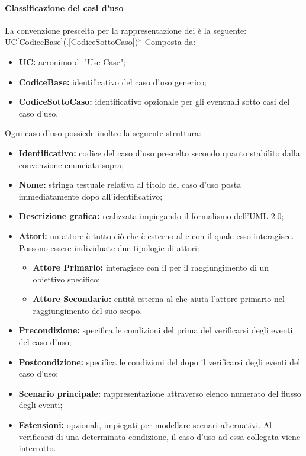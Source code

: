 \paragraph{Classificazione dei casi d'uso}
\label{Class_uso}
La convenzione prescelta per la rappresentazione dei  è la seguente:
UC[CodiceBase](.[CodiceSottoCaso])*
Composta da:
\begin{itemize}
	\item \textbf{UC:} acronimo di "Use Case";
	\item \textbf{CodiceBase:} identificativo del caso d'uso generico;
	\item \textbf{CodiceSottoCaso:} identificativo opzionale per gli eventuali sotto casi del caso d'uso.
\end{itemize}
Ogni caso d'uso possiede inoltre la seguente struttura:
\begin{itemize}
	\item \textbf{Identificativo:} codice del caso d'uso prescelto secondo quanto stabilito dalla convenzione enunciata sopra;
	\item \textbf{Nome:} stringa testuale relativa al titolo del caso d'uso posta immediatamente dopo all'identificativo;
	\item \textbf{Descrizione grafica:} realizzata impiegando il formalismo dell'UML 2.0;
	\item \textbf{Attori:} un attore è tutto ciò che è esterno al  e con il quale esso interagisce. Possono essere individuate due tipologie di attori:
	\begin{itemize}
		\item \textbf{Attore Primario:} interagisce con il  per il raggiungimento di un obiettivo specifico;
		\item \textbf{Attore Secondario:} entità esterna al  che aiuta l'attore primario nel raggiungimento del suo scopo.
	\end{itemize}
	\item \textbf{Precondizione:} specifica le condizioni del  prima del verificarsi degli eventi del caso d'uso;
	\item \textbf{Postcondizione:} specifica le condizioni del  dopo il verificarsi degli eventi del caso d'uso;
	\item \textbf{Scenario principale:} rappresentazione attraverso elenco numerato del flusso degli eventi;
	\item \textbf{Estensioni:} opzionali, impiegati per modellare scenari alternativi. Al verificarsi di una determinata condizione, il caso d'uso ad essa collegata viene interrotto.
\end{itemize}
